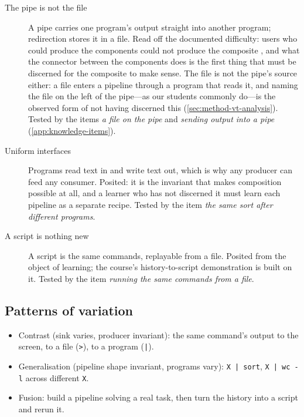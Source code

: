 \begin{description}
  \item[The pipe is not the file]
    A pipe carries one program's output straight into another program;
    redirection stores it in a file.
    Read off the documented difficulty: users who could produce the
    components could not produce the composite
    \autocite{Doane1992UnixPrompts}, and what the connector between the
    components does is the first thing that must be discerned for the
    composite to make sense.
    The file is not the pipe's source either: a file enters a pipeline
    through a program that reads it, and naming the file on the left of
    the pipe---as our students commonly do---is the observed form of
    not having discerned this (\cref{sec:method-vt-analysis}).
    Tested by the items \emph{a file on the pipe} and \emph{sending
    output into a pipe} (\cref{app:knowledge-items}).
  \item[Uniform interfaces]
    Programs read text in and write text out, which is why any producer
    can feed any consumer.
    Posited: it is the invariant that makes composition possible at all,
    and a learner who has not discerned it must learn each pipeline as
    a separate recipe.
    Tested by the item \emph{the same sort after different programs}.
  \item[A script is nothing new]
    A script is the same commands, replayable from a file.
    Posited from the object of learning; the course's
    history-to-script demonstration is built on it.
    Tested by the item \emph{running the same commands from a file}.
\end{description}

\subsection{Patterns of variation}

\begin{itemize}
  \item Contrast (sink varies, producer invariant): the same command's
    output to the screen, to a file (\texttt{>}), to a program
    (\texttt{|}).
  \item Generalisation (pipeline shape invariant, programs vary):
    \texttt{X | sort}, \texttt{X | wc -l} across different \texttt{X}.
  \item Fusion: build a pipeline solving a real task, then turn the
    history into a script and rerun it.
\end{itemize}
